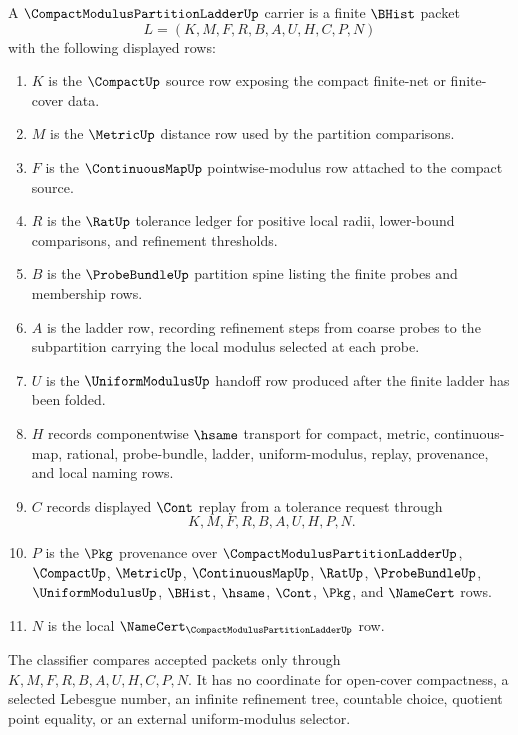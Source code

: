 \begin{definition}
\label{def:compact-modulus-partition-ladder-carrier}
A $\CompactModulusPartitionLadderUp$ carrier is a finite $\BHist$ packet
$$
L=(K,M,F,R,B,A,U,H,C,P,N)
$$
with the following displayed rows:
\begin{enumerate}
\item $K$ is the $\CompactUp$ source row exposing the compact finite-net or finite-cover data.
\item $M$ is the $\MetricUp$ distance row used by the partition comparisons.
\item $F$ is the $\ContinuousMapUp$ pointwise-modulus row attached to the compact source.
\item $R$ is the $\RatUp$ tolerance ledger for positive local radii, lower-bound comparisons, and refinement thresholds.
\item $B$ is the $\ProbeBundleUp$ partition spine listing the finite probes and membership rows.
\item $A$ is the ladder row, recording refinement steps from coarse probes to the subpartition carrying the local modulus selected at each probe.
\item $U$ is the $\UniformModulusUp$ handoff row produced after the finite ladder has been folded.
\item $H$ records componentwise $\hsame$ transport for compact, metric, continuous-map, rational, probe-bundle, ladder, uniform-modulus, replay, provenance, and local naming rows.
\item $C$ records displayed $\Cont$ replay from a tolerance request through
$$
K,M,F,R,B,A,U,H,P,N .
$$
\item $P$ is the $\Pkg$ provenance over $\CompactModulusPartitionLadderUp$, $\CompactUp$, $\MetricUp$, $\ContinuousMapUp$, $\RatUp$, $\ProbeBundleUp$, $\UniformModulusUp$, $\BHist$, $\hsame$, $\Cont$, $\Pkg$, and $\NameCert$ rows.
\item $N$ is the local $\NameCert_{\CompactModulusPartitionLadderUp}$ row.
\end{enumerate}
The classifier compares accepted packets only through $K,M,F,R,B,A,U,H,C,P,N$. It has no coordinate for open-cover compactness, a selected Lebesgue number, an infinite refinement tree, countable choice, quotient point equality, or an external uniform-modulus selector.
\end{definition}

